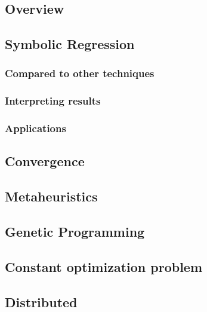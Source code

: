 \subsection{Overview}

\subsection{Symbolic Regression}

\subsubsection{Compared to other techniques}

\subsubsection{Interpreting results}

\subsubsection{Applications}

\subsection{Convergence}
\subsection{Metaheuristics}

\subsection{Genetic Programming}

\subsection{Constant optimization problem}

\subsection{Distributed}
